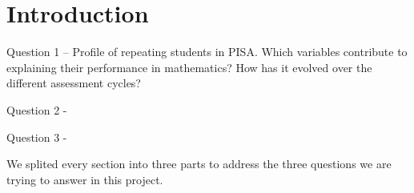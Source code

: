 \section{Introduction}\label{sec:introduction}

Question 1 – Profile of repeating students in PISA. Which variables contribute to explaining their performance in mathematics? How has it evolved over the different assessment cycles?

Question 2 -

Question 3 -


We splited every section into three parts to address the three questions we are trying to answer in this project.